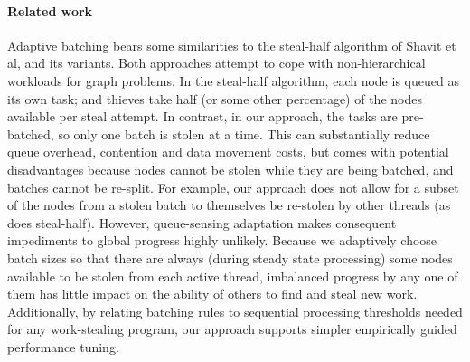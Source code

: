 \paragraph{Related work}
Adaptive batching bears some similarities to the steal-half algorithm
of Shavit et al, and its variants. Both approaches attempt to cope
with non-hierarchical workloads for graph problems. In the steal-half
algorithm, each node is queued as its own task; and thieves take half
(or some other percentage) of the nodes available per steal
attempt. In contrast, in our approach, the tasks are pre-batched, so
only one batch is stolen at a time. This can substantially reduce
queue overhead, contention and data movement costs, but comes with
potential disadvantages because nodes cannot be stolen while they are
being batched, and batches cannot be re-split.  For example, our
approach does not allow for a subset of the nodes from a stolen batch
to themselves be re-stolen by other threads (as does
steal-half). However, queue-sensing adaptation makes consequent
impediments to global progress highly unlikely.  Because we adaptively
choose batch sizes so that there are always (during steady state
processing) some nodes available to be stolen from each active thread,
imbalanced progress by any one of them has little impact on the
ability of others to find and steal new work.  Additionally, by
relating batching rules to sequential processing thresholds needed for
any work-stealing program, our approach supports simpler empirically
guided performance tuning.



